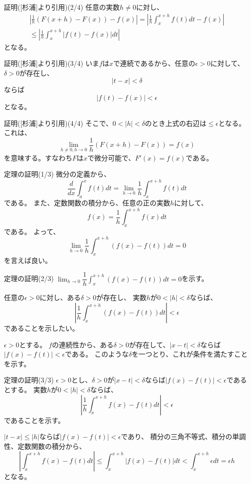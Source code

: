 \documentclass[unicode,12pt]{beamer}%
\begin{document}
\begin{frame}{証明([杉浦]より引用)(2/4)}
  任意の実数$h\neq0$に対し、
  \begin{align*}
    \left\lvert\frac{1}{h}(F(x+h)-F(x))-f(x)\right\rvert
    =\left\lvert\frac{1}{h}\int^{x+h}_xf(t)dt-f(x)\right\rvert\\
    \leq\left\lvert\frac{1}{h}\int^{x+h}_x\lvert f(t)-f(x)\rvert dt\right\rvert 
  \end{align*}
  となる。
\end{frame}

\begin{frame}{証明([杉浦]より引用)(3/4)}
  いま$f$は$x$で連続であるから、任意の$\epsilon>0$に対して、$\delta>0$が存在し、
  $$
  \lvert t-x\rvert<\delta
  $$
  ならば
  $$
  \lvert f(t)-f(x)\rvert<\epsilon
  $$
  となる。
\end{frame}

\begin{frame}{証明([杉浦]より引用)(4/4)}
  そこで、$0<\lvert h\rvert <\delta$のとき上式の右辺は$\leq\epsilon$となる。
  これは、
  $$
  \lim_{h\neq0,h\to0}\frac{1}{h}(F(x+h)-F(x))=f(x)
  $$
  を意味する。すなわち$F$は$x$で微分可能で、$F'(x)=f(x)$である。
\end{frame}

\begin{frame}{定理の証明(1/3)}
  微分の定義から、
  $$
  \frac{d}{dx}\int^x_af(t)dt=
  \lim_{h\to 0}\frac{1}{h}\int^{x+h}_xf(t)dt
  $$
  である。
  また、定数関数の積分から、任意の正の実数$h$に対して、
  $$
  f(x)=\frac{1}{h}\int^{x+h}_xf(x)dt
  $$
  である。
  よって、
  $$
  \lim_{h\to0}\frac{1}{h}\int_{x}^{x+h}(f(x)-f(t))dt=0
  $$
  を言えば良い。
\end{frame}

\begin{frame}{定理の証明(2/3)}
  $\displaystyle\lim_{h\to0}\dfrac{1}{h}\displaystyle\int_{x}^{x+h}(f(x)-f(t))dt=0$を示す。

  任意の$\epsilon>0$に対し、ある$\delta>0$が存在し、
  実数$h$が$0<\lvert h\rvert<\delta$ならば、
  $$
  \left\lvert \frac{1}{h}\int_{x}^{x+h}(f(x)-f(t))dt\right\rvert<\epsilon
  $$
  であることを示したい。

  $\epsilon>0$とする。
  $f$の連続性から、ある$\delta>0$が存在して、$\lvert x-t\rvert<\delta$ならば$\lvert f(x)-f(t)\rvert<\epsilon$である。
  このような$\delta$を一つとり、これが条件を満たすことを示す。
\end{frame}

\begin{frame}{定理の証明(3/3)}
  $\epsilon >0$とし、$\delta>0$が$\lvert x-t\rvert<\delta$ならば$\lvert f(x)-f(t)\rvert<\epsilon$であるとする。
  実数$h$が$0<\lvert h\rvert<\delta$ならば、
  $$
  \left\lvert \frac{1}{h}\int_{x}^{x+h}f(x)-f(t)dt\right\rvert<\epsilon
  $$
  であることを示す。

  $\lvert t-x\rvert\leq\lvert h\rvert$ならば$\lvert f(x)-f(t)\rvert<\epsilon$であり、
  積分の三角不等式、積分の単調性、定数関数の積分から、
  $$
  \left\lvert\int^{x+h}_xf(x)-f(t)dt\right\rvert
  \leq\int^{x+h}_x\lvert f(x)-f(t)\rvert dt
  <\int^{x+h}_x\epsilon dt=\epsilon h
  $$
  となる。
\end{frame}
\end{document}
